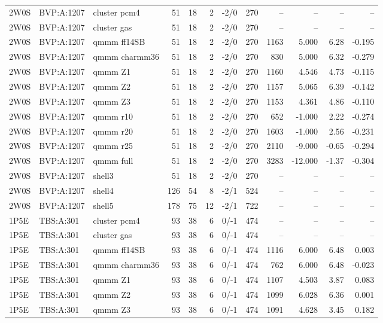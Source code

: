 \documentclass[journal=jcisd8,manuscript=suppinfo]{achemso}
\begin{document}
\begin{singlespace}
{\begin{longtable}{lllrrrlrrrrr}
2W0S & BVP:A:1207 & cluster pcm4 & 51 & 18 & 2 & -2/0 & 270 & -- & -- & -- & --\\
2W0S & BVP:A:1207 & cluster gas & 51 & 18 & 2 & -2/0 & 270 & -- & -- & -- & --\\
2W0S & BVP:A:1207 & qmmm ff14SB & 51 & 18 & 2 & -2/0 & 270 & 1163 & 5.000 & 6.28 & -0.195\\
2W0S & BVP:A:1207 & qmmm charmm36 & 51 & 18 & 2 & -2/0 & 270 & 830 & 5.000 & 6.32 & -0.279\\
2W0S & BVP:A:1207 & qmmm Z1 & 51 & 18 & 2 & -2/0 & 270 & 1160 & 4.546 & 4.73 & -0.115\\
2W0S & BVP:A:1207 & qmmm Z2 & 51 & 18 & 2 & -2/0 & 270 & 1157 & 5.065 & 6.39 & -0.142\\
2W0S & BVP:A:1207 & qmmm Z3 & 51 & 18 & 2 & -2/0 & 270 & 1153 & 4.361 & 4.86 & -0.110\\
2W0S & BVP:A:1207 & qmmm r10 & 51 & 18 & 2 & -2/0 & 270 & 652 & -1.000 & 2.22 & -0.274\\
2W0S & BVP:A:1207 & qmmm r20 & 51 & 18 & 2 & -2/0 & 270 & 1603 & -1.000 & 2.56 & -0.231\\
2W0S & BVP:A:1207 & qmmm r25 & 51 & 18 & 2 & -2/0 & 270 & 2110 & -9.000 & -0.65 & -0.294\\
2W0S & BVP:A:1207 & qmmm full & 51 & 18 & 2 & -2/0 & 270 & 3283 & -12.000 & -1.37 & -0.304\\
2W0S & BVP:A:1207 & shell3 & 51 & 18 & 2 & -2/0 & 270 & -- & -- & -- & --\\
2W0S & BVP:A:1207 & shell4 & 126 & 54 & 8 & -2/1 & 524 & -- & -- & -- & --\\
2W0S & BVP:A:1207 & shell5 & 178 & 75 & 12 & -2/1 & 722 & -- & -- & -- & --\\
1P5E & TBS:A:301 & cluster pcm4 & 93 & 38 & 6 & 0/-1 & 474 & -- & -- & -- & --\\
1P5E & TBS:A:301 & cluster gas & 93 & 38 & 6 & 0/-1 & 474 & -- & -- & -- & --\\
1P5E & TBS:A:301 & qmmm ff14SB & 93 & 38 & 6 & 0/-1 & 474 & 1116 & 6.000 & 6.48 & 0.003\\
1P5E & TBS:A:301 & qmmm charmm36 & 93 & 38 & 6 & 0/-1 & 474 & 762 & 6.000 & 6.48 & -0.023\\
1P5E & TBS:A:301 & qmmm Z1 & 93 & 38 & 6 & 0/-1 & 474 & 1107 & 4.503 & 3.87 & 0.083\\
1P5E & TBS:A:301 & qmmm Z2 & 93 & 38 & 6 & 0/-1 & 474 & 1099 & 6.028 & 6.36 & 0.001\\
1P5E & TBS:A:301 & qmmm Z3 & 93 & 38 & 6 & 0/-1 & 474 & 1091 & 4.628 & 3.45 & 0.182\\

\end{longtable}}
\end{singlespace}
\end{document}
